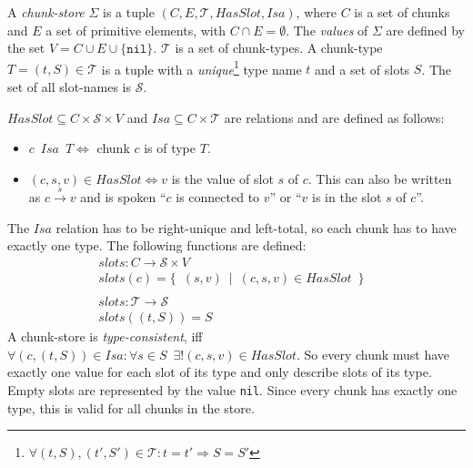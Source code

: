 \begin{definition}
A \emph{chunk-store} $\Sigma$ is a tuple $(C,E,\mathcal{T},HasSlot,Isa)$, where $C$ is a set of chunks and $E$ a set of primitive elements, with $C \cap E = \emptyset$. The \emph{values} of $\Sigma$ are defined by the set $V = C \cup E \cup \{ \mathtt{nil} \}$. $\mathcal{T}$ is a set of chunk-types. A chunk-type $T = (t,S) \in \mathcal{T}$ is a tuple with a \emph{unique}\footnote{$\forall (t,S), (t',S') \in \mathcal{T}: t = t' \Rightarrow S = S'$ } type name $t$ and a set of slots $S$. The set of all slot-names is $\mathcal{S}$. 

$HasSlot \subseteq C \times \mathcal{S} \times V$ and $Isa \subseteq C \times \mathcal{T}$ are relations and are defined as follows:

\begin{itemize}
 \item $c \enspace Isa \enspace T \Leftrightarrow$ chunk $c$ is of type $T$.
 \item $(c,s,v) \in HasSlot \Leftrightarrow v$ is the value of slot $s$ of $c$. This can also be written as $c \overset{s}{\longrightarrow} v$ and is spoken ``$c$ is connected to $v$'' or ``$v$ is in the slot $s$ of $c$''.
\end{itemize}

The $Isa$ relation has to be right-unique and left-total, so each chunk has to have exactly one type. The following functions are defined:
\begin{align*}
slots: C \rightarrow \mathcal{S} \times V &\\
slots(c) = \{ \enspace (s,v) \enspace | \enspace (c,s,v) \in HasSlot \enspace \}&\\
\\
slots: \mathcal{T} \rightarrow \mathcal{S} &\\
      slots((t,S)) = S&
\end{align*}
A chunk-store is \emph{type-consistent}, iff $\forall (c,(t,S)) \in Isa: \forall s \in S \enspace \exists ! (c,s,v) \in HasSlot$. So every chunk must have exactly one value for each slot of its type and only describe slots of its type. Empty slots are represented by the value \lstinline|nil|. Since every chunk has exactly one type, this is valid for all chunks in the store.


\end{definition}


